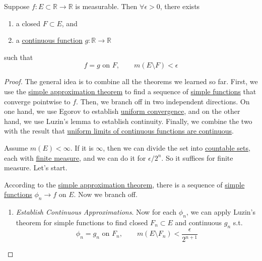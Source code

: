   \begin{theorem}[Luzin]
    \label{thm:luzin}
    Suppose $f: E \subset \mathbb{R} \to \mathbb{R}$ is measurable. Then $\forall \epsilon > 0$, there exists 
    \begin{enumerate}
      \item a closed $F \subset E$, and 
      \item a \hyperref[pst-def:continuous_func]{continuous function} $g: \mathbb{R} \to \mathbb{R}$
    \end{enumerate}
    such that 
    \begin{equation}
      f = g \text{ on } F, \qquad m(E \setminus F) < \epsilon
    \end{equation}
  \end{theorem}
  \begin{proof}
    The general idea is to combine all the theorems we learned so far. First, we use the \hyperref[thm:simple-approximation-theorem]{simple approximation theorem} to find a sequence of \hyperref[def:simple-functions]{simple functions} that converge pointwise to $f$. Then, we branch off in two independent directions. On one hand, we use Egorov to establish \hyperref[real-def:uniform-convergence]{uniform convergence}, and on the other hand, we use Luzin's lemma to establish continuity. Finally, we combine the two with the result that \hyperref[real-thm:uniform-limits-of-continuous-functions-are]{uniform limits of continuous functions are continuous}. 

    Assume $m(E) < \infty$. If it is $\infty$, then we can divide the set into \hyperref[st-def:countable]{countable sets}, each with \hyperref[def:finite-measure]{finite measure}, and we can do it for $\epsilon/2^{n}$. So it suffices for finite measure. Let's start. 

    According to the \hyperref[thm:simple-approximation-theorem]{simple approximation theorem}, there is a sequence of \hyperref[def:simple-functions]{simple functions} $\phi_n \to f$ on $E$. Now we branch off. 
    \begin{enumerate}
      \item \textit{Establish Continuous Approximations}. Now for each $\phi_n$, we can apply Luzin's theorem for simple functions to find closed $F_n \subset E$ and continuous $g_n$ s.t. 
      \begin{equation}
        \phi_n = g_n \text{ on } F_n, \qquad m(E \setminus F_n) < \frac{\epsilon}{2^{n+1}} 
      \end{equation}


\end{enumerate}
\end{proof}
